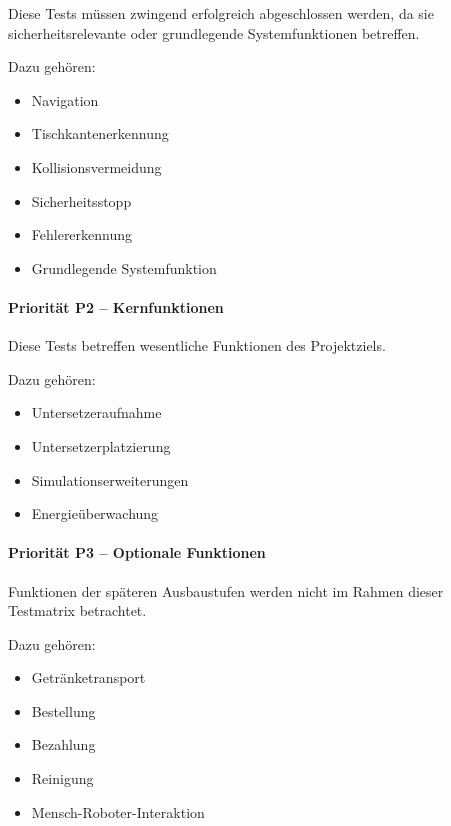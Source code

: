 \documentclass[
  a4paper,
  12pt,
  DIV=12,        %
  parskip=half,  %
  headings=small %
]{scrartcl}
\theoremstyle{definition}
\providecommand{\tightlist}{%
  \setlength{\itemsep}{0pt}\setlength{\parskip}{0pt}}
\theoremstyle{definition}
\begin{document}
Diese Tests müssen zwingend erfolgreich abgeschlossen werden, da sie
sicherheitsrelevante oder grundlegende Systemfunktionen betreffen.

Dazu gehören:

\begin{itemize}
\tightlist
\item
  Navigation
\item
  Tischkantenerkennung
\item
  Kollisionsvermeidung
\item
  Sicherheitsstopp
\item
  Fehlererkennung
\item
  Grundlegende Systemfunktion
\end{itemize}

\paragraph{Priorität P2 --
Kernfunktionen}\label{priorituxe4t-p2-kernfunktionen-1}

Diese Tests betreffen wesentliche Funktionen des Projektziels.

Dazu gehören:

\begin{itemize}
\tightlist
\item
  Untersetzeraufnahme
\item
  Untersetzerplatzierung
\item
  Simulationserweiterungen
\item
  Energieüberwachung
\end{itemize}

\paragraph{Priorität P3 -- Optionale
Funktionen}\label{priorituxe4t-p3-optionale-funktionen}

Funktionen der späteren Ausbaustufen werden nicht im Rahmen dieser
Testmatrix betrachtet.

Dazu gehören:

\begin{itemize}
\tightlist
\item
  Getränketransport
\item
  Bestellung
\item
  Bezahlung
\item
  Reinigung
\item
  Mensch-Roboter-Interaktion
\end{itemize}
\end{document}
